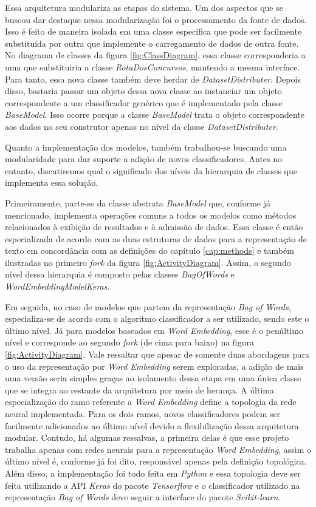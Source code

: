Essa arquitetura modulariza as etapas do sistema. Um dos aspectos que se buscou dar destaque nessa modularização foi o processamento da fonte de dados. Isso é feito de maneira isolada em uma classe específica que pode ser facilmente substituída por outra que implemente o carregamento de dados de outra fonte. No diagrama de classes da figura \ref{fig:ClassDiagram}, essa classe corresponderia a uma que substituiria a classe \textit{RotaDosConcursos}, mantendo a mesma interface. Para tanto, essa nova classe também deve herdar de \textit{DatasetDistributer}. Depois disso, bastaria passar um objeto dessa nova classe ao instanciar um objeto correspondente a um classificador genérico que é implementado pela classe \textit{BaseModel}. Isso ocorre porque a classe \textit{BaseModel} trata o objeto correspondente aos dados no seu construtor apenas no nível da classe \textit{DatasetDistributer}.

Quanto a implementação dos modelos, também trabalhou-se buscando uma modularidade para dar suporte a adição de novos classificadores. Antes no entanto, discutiremos qual o significado dos níveis da hierarquia de classes que implementa essa solução.

Primeiramente, parte-se da classe abstrata \textit{BaseModel} que, conforme já mencionado, implementa operações comuns a todos os modelos como métodos relacionados à exibição de resultados e à admissão de dados. Essa classe é então especializada de acordo com as duas estruturas de dados para a representação de texto em concordância com as definições do capítulo \ref{cap:methods} e também ilustradas no primeiro \textit{fork} da figura \ref{fig:ActivityDiagram}. Assim, o segundo nível dessa hierarquia é composto pelas classes \textit{BagOfWords} e \textit{WordEmbeddingModelKeras}.

Em seguida, no caso de modelos que partem da representação \textit{Bag of Words}, especializa-se de acordo com o algoritmo classificador a ser utilizado, sendo este o último nível. Já para modelos baseados em \textit{Word Embedding}, esse é o penúltimo nível e corresponde ao segundo \textit{fork} (de cima para baixo) na figura \ref{fig:ActivityDiagram}. Vale ressaltar que apesar de somente duas abordagens para o uso da representação por \textit{Word Embedding} serem exploradas, a adição de mais uma versão seria simples graças ao isolamento dessa etapa em uma única classe que se integra ao restante da arquitetura por meio de herança. A última especialização do ramo referente a \textit{Word Embedding} define a topologia da rede neural implementada. Para os dois ramos, novos classificadores podem ser facilmente adicionados ao último nível devido a flexibilização dessa arquitetura modular. Contudo, há algumas ressalvas, a primeira delas é que esse projeto trabalha apenas com redes neurais para a representação \textit{Word Embedding}, assim o último nível é, conforme já foi dito, responsável apenas pela definição topológica. Além disso, a implementação foi todo feita em \textit{Python} e essa topologia deve ser feita utilizando a API \textit{Keras} do pacote \textit{Tensorflow} e o classificador utilizado na representação \textit{Bag of Words} deve seguir a interface do pacote \textit{Scikit-learn}.

